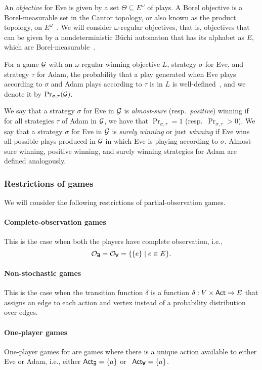 An \emph{objective} for Eve is given by a set $\Theta \subseteq E^{\omega}$ of plays. A Borel objective is a Borel-measurable set in the Cantor topology, or also known as the product topology, on $E^{\omega}$~\cite[Chapter 17]{Kec12}. We will consider $\omega$-regular objectives, that is, objectives that can be given by a nondeterministic B\"uchi automaton that has its alphabet as $E$, which are Borel-measurable~\cite{Lan69}.

For a game $\mathcal{G}$ with an $\omega$-regular winning objective $L$, strategy $\sigma$ for Eve, and strategy $\tau$ for Adam, the probability that a play generated when Eve plays according to $\sigma$ and Adam plays according to $\tau$ is in $L$ is well-defined~\cite[Lemma 4.1]{Var85}, and we denote it by $\Pr_{\sigma,\tau}(\mathcal{G})$.

We say that a strategy $\sigma$ for Eve in $\mathcal{G}$ is \emph{almost-sure} (resp.\ \emph{positive}) winning if for all strategies $\tau$ of Adam in $\mathcal{G}$, we have that $\Pr_{\sigma,\tau}=1$ (resp.\ $\Pr_{\sigma,\tau}>0$). We say that a strategy $\sigma$ for Eve in $\mathcal{G}$ is \emph{surely winning} or just \emph{winning} if Eve wins all possible plays produced in $\mathcal{G}$ in which Eve is playing according to $\sigma$. Almost-sure winning, positive winning, and surely winning strategies for Adam are defined analogously. 

\subsubsection*{Restrictions of games} 
We will consider the following restrictions of partial-observation games.
\paragraph*{Complete-observation games} This is the case when both the players have complete observation, i.e., $$\mathcal{O}_{\pmb{\exists}} = \mathcal{O}_{\pmb{\forall}} =\{\{e\}\mid e\in E\}.$$

\paragraph*{Non-stochastic games} This is the case when the transition function $\delta$ is a function $\delta:V\times {\mathsf{Act}} \xrightarrow{} E$ that assigns an edge to each action and vertex instead of a probability distribution over edges.

\paragraph*{One-player games}
One-player games for are games where there is a unique action available to either Eve or Adam, i.e., either ${\mathsf{Act}}_{\pmb{\exists}}=\{a\}$ or \ ${\mathsf{Act}}_{\pmb{\forall}}=\{a\}$. 


